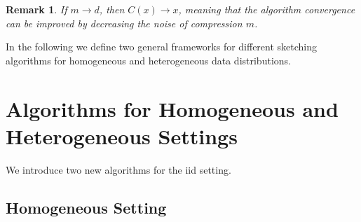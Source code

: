\documentclass[twoside]{article}
\newtheorem{remark}{Remark}
\begin{document}
\begin{remark}
If $m\rightarrow d$, then $C(x)\rightarrow x$, meaning that the algorithm convergence can be improved by decreasing the noise of compression $m$. 
\end{remark}

In the following we define two general frameworks for different sketching algorithms for homogeneous and heterogeneous data distributions.


\vspace{-0.05in}
\section{Algorithms for Homogeneous and Heterogeneous Settings}\label{sec:algos}
\vspace{-0.05in}

We introduce two new algorithms for the iid setting.

\vspace{-0.05in}
\subsection{Homogeneous Setting}
\vspace{-0.05in}
\end{document}
